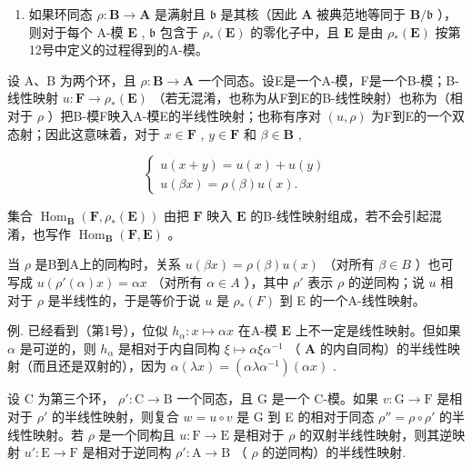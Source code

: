 \begin{enumerate}
\def\labelenumi{(\arabic{enumi})}
\setcounter{enumi}{1}
\tightlist
\item
  如果环同态 \(\rho: \mathbf{B} \to \mathbf{A}\) 是满射且 \(\mathfrak{b}\) 是其核（因此 \(\mathbf{A}\) 被典范地等同于 \(\mathbf{B} / \mathfrak{b}\) ），则对于每个 A-模 \(\mathbf{E}\) , \(\mathfrak{b}\) 包含于 \(\rho_*(\mathbf{E})\) 的零化子中，且 \(\mathbf{E}\) 是由 \(\rho_*(\mathbf{E})\) 按第12号中定义的过程得到的A-模。
\end{enumerate}

设 A、B 为两个环，且 \(\rho: \mathbf{B} \to \mathbf{A}\) 一个同态。设E是一个A-模，F是一个B-模；B-线性映射 \(u: \mathbf{F} \to \rho_{*}(\mathbf{E})\) （若无混淆，也称为从F到E的B-线性映射）也称为（相对于 \(\rho\) ）把B-模F映入A-模E的半线性映射；也称有序对 \((u, \rho)\) 为F到E的一个双态射；因此这意味着，对于 \(x \in \mathbf{F}\) , \(y \in \mathbf{F}\) 和 \(\beta \in \mathbf{B}\) ,

\[
\left\{ \begin{array}{l} u (x + y) = u (x) + u (y) \\ u (\beta x) = \rho (\beta) u (x). \end{array} \right.\tag{48}
\]

集合 \(\operatorname{Hom}_{\mathbf{B}}(\mathbf{F},\rho_{*}(\mathbf{E}))\) 由把 \(\mathbf{F}\) 映入 \(\mathbf{E}\) 的B-线性映射组成，若不会引起混淆，也写作 \(\operatorname{Hom}_{\mathbf{B}}(\mathbf{F},\mathbf{E})\) 。

当 \(\rho\) 是B到A上的同构时，关系 \(u(\beta x) = \rho(\beta) u(x)\) （对所有 \(\beta \in B\) ）也可写成 \(u(\rho'(\alpha)x) = \alpha x\) （对所有 \(\alpha \in A\) ），其中 \(\rho'\) 表示 \(\rho\) 的逆同构；说 \(u\) 相对于 \(\rho\) 是半线性的，于是等价于说 \(u\) 是 \(\rho_*(F)\) 到 E 的一个A-线性映射。

例. 已经看到（第1号），位似 \(h_{\alpha} \colon x \mapsto \alpha x\) 在A-模 \(\mathbf{E}\) 上不一定是线性映射。但如果 \(\alpha\) 是可逆的，则 \(h_{\alpha}\) 是相对于内自同构 \(\xi \mapsto \alpha \xi \alpha^{-1}\) （ \(\mathbf{A}\) 的内自同构）的半线性映射（而且还是双射的），因为 \(\alpha(\lambda x) = (\alpha \lambda \alpha^{-1})(\alpha x)\) .

设 C 为第三个环， \(\rho':\mathrm{C}\to\mathrm{B}\) 一个同态，且 G 是一个 C-模。如果 \(v:\mathrm{G}\to\mathrm{F}\) 是相对于 \(\rho'\) 的半线性映射，则复合 \(w=u\circ v\) 是 G 到 E 的相对于同态 \(\rho''=\rho\circ\rho'\) 的半线性映射。若 \(\rho\) 是一个同构且 \(u:\mathrm{F}\to\mathrm{E}\) 是相对于 \(\rho\) 的双射半线性映射，则其逆映射 \(u':\mathrm{E}\to\mathrm{F}\) 是相对于逆同构 \(\rho':\mathrm{A}\to\mathrm{B}\) （ \(\rho\) 的逆同构）的半线性映射.

